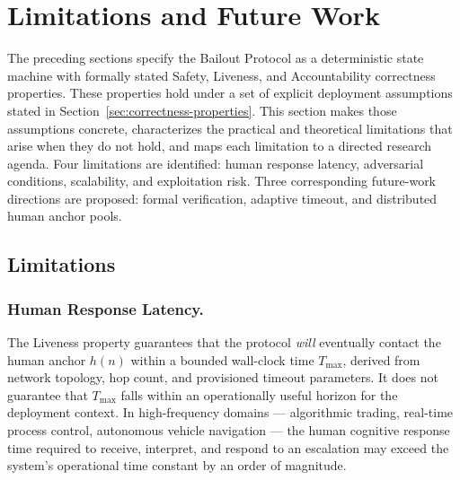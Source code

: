 \section{Limitations and Future Work}\label{sec:limitations}

The preceding sections specify the Bailout Protocol as a deterministic state machine with formally stated Safety, Liveness, and Accountability correctness properties. These properties hold under a set of explicit deployment assumptions stated in Section~\ref{sec:correctness-properties}. This section makes those assumptions concrete, characterizes the practical and theoretical limitations that arise when they do not hold, and maps each limitation to a directed research agenda. Four limitations are identified: human response latency, adversarial conditions, scalability, and exploitation risk. Three corresponding future-work directions are proposed: formal verification, adaptive timeout, and distributed human anchor pools.

\subsection{Limitations}\label{sec:limitations-subsection}

\subsubsection{Human Response Latency.}\label{sec:latency-limitation}

The Liveness property guarantees that the protocol \emph{will} eventually contact the human anchor $h(n)$ within a bounded wall-clock time $T_{\max}$, derived from network topology, hop count, and provisioned timeout parameters. It does not guarantee that $T_{\max}$ falls within an operationally useful horizon for the deployment context. In high-frequency domains --- algorithmic trading, real-time process control, autonomous vehicle navigation --- the human cognitive response time required to receive, interpret, and respond to an escalation may exceed the system's operational time constant by an order of magnitude.

